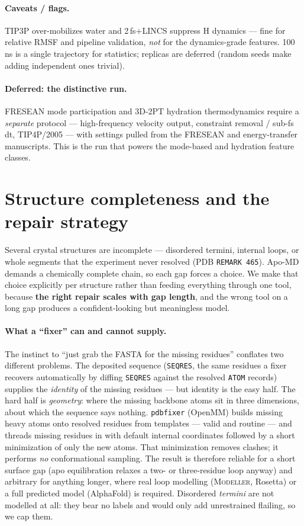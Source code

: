 \paragraph{Caveats / flags.} TIP3P over-mobilizes water and 2\,fs$+$LINCS suppress H dynamics --- fine
for relative RMSF and pipeline validation, \emph{not} for the dynamics-grade features. 100\,ns is a single
trajectory for statistics; replicas are deferred (random seeds make adding independent ones trivial).

\paragraph{Deferred: the distinctive run.} FRESEAN mode participation and 3D-2PT hydration
thermodynamics require a \emph{separate} protocol --- high-frequency velocity output, constraint
removal / sub-fs dt, TIP4P/2005 --- with settings pulled from the FRESEAN and energy-transfer
manuscripts. This is the run that powers the mode-based and hydration feature classes.

\section{Structure completeness and the repair strategy}\label{sec:repair}

Several crystal structures are incomplete --- disordered termini, internal loops, or whole
segments that the experiment never resolved (PDB \texttt{REMARK 465}). Apo-MD demands a chemically
complete chain, so each gap forces a choice. We make that choice explicitly per structure rather
than feeding everything through one tool, because \textbf{the right repair scales with gap length},
and the wrong tool on a long gap produces a confident-looking but meaningless model.

\paragraph{What a ``fixer'' can and cannot supply.} The instinct to ``just grab the FASTA for the
missing residues'' conflates two different problems. The deposited sequence (\texttt{SEQRES}, the
same residues a fixer recovers automatically by diffing \texttt{SEQRES} against the resolved
\texttt{ATOM} records) supplies the \emph{identity} of the missing residues --- but identity is the
easy half. The hard half is \emph{geometry}: where the missing backbone atoms sit in three
dimensions, about which the sequence says nothing. \texttt{pdbfixer} (OpenMM) builds missing
heavy atoms onto resolved residues from templates --- valid and routine --- and threads missing
residues in with default internal coordinates followed by a short minimization of only the new
atoms. That minimization removes clashes; it performs \emph{no} conformational sampling. The result
is therefore reliable for a short surface gap (apo equilibration relaxes a two- or three-residue
loop anyway) and arbitrary for anything longer, where real loop modelling (\textsc{Modeller},
Rosetta) or a full predicted model (AlphaFold) is required. Disordered \emph{termini} are not
modelled at all: they bear no labels and would only add unrestrained flailing, so we cap them.

